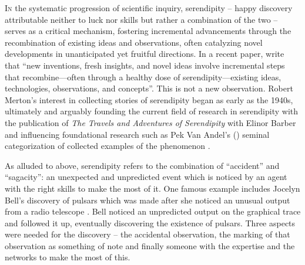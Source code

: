 \documentclass[authordate, empirical]{jote-new-article}
\author[1]{\mbox{Wendy Ross}}
\affil[1]{London Metropolitan \mbox{University}}
\author[2]{\mbox{Samantha Copeland\orcid{0000-0002-6946-7165}}}
\affil[2]{Delft University \mbox{of Technology}}
\author[3]{\mbox{Stuart Firestein\orcid{0000-0003-1774-5853}}}
\affil[3]{Columbia University}
\begin{document}
\begin{frontmatter}
  \maketitle
  \begin{abstract}
    \printabstracttext
  \end{abstract}
\end{frontmatter}


\lettrine{I}{n} the systematic progression of scientific inquiry, serendipity -- happy discovery attributable neither to luck nor skills but rather a combination of the two -- serves as a critical mechanism, fostering incremental advancements through the recombination of existing ideas and observations, often catalyzing novel developments in unanticipated yet fruitful directions. In a recent paper, \textcites[][p. 2]{Henrich2023} write that “new inventions, fresh insights, and novel ideas involve incremental steps that recombine—often through a healthy dose of serendipity—existing ideas, technologies, observations, and concepts”. This is not a new observation. Robert Merton's interest in collecting stories of serendipity began as early as the 1940s, ultimately and arguably founding the current field of research in serendipity with the publication of \emph{The Travels and Adventures of Serendipity }with Elinor Barber \parencites{Merton2004}{Yaqub2018} and influencing foundational research such as Pek Van Andel's (\hspace*{-2pt}\citeyear{VanAndel1994}) seminal categorization of collected examples of the phenomenon \parencites{foster2003serendipity}.



As alluded to above, serendipity refers to the combination of “accident” and “sagacity”: an unexpected and unpredicted event which is noticed by an agent with the right skills to make the most of it. One famous example includes Jocelyn Bell's discovery of pulsars which was made after she noticed an unusual output from a radio telescope \parencites{Arfini2023}. Bell noticed an unpredicted output on the graphical trace and followed it up, eventually discovering the existence of pulsars. Three aspects were needed for the discovery -- the accidental observation, the marking of that observation as something of note and finally someone with the expertise and the networks to make the most of this.
\end{document}
